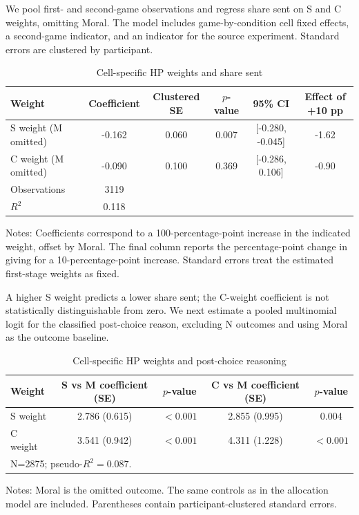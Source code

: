 \documentclass{article}
\begin{document}
We pool first- and second-game observations and regress share sent on S and C weights, omitting Moral. The model includes game-by-condition cell fixed effects, a second-game indicator, and an indicator for the source experiment. Standard errors are clustered by participant.

\begin{table}[H]
\centering
\caption{Cell-specific HP weights and share sent}
\label{tab:within_allocation_prediction}
\begin{tabular}{lccccc}
\toprule
Weight & Coefficient & Clustered SE & $p$-value & 95\% CI & Effect of +10 pp \\
\midrule
S weight (M omitted) & -0.162 & 0.060 & 0.007 & [-0.280, -0.045] & -1.62 \\
C weight (M omitted) & -0.090 & 0.100 & 0.369 & [-0.286, 0.106] & -0.90 \\
\midrule
Observations & 3119 & & & & \\ 
$R^2$ & 0.118 & & & & \\ 
\bottomrule
\end{tabular}
\begin{flushleft}
\footnotesize Notes: Coefficients correspond to a 100-percentage-point increase in the indicated weight, offset by Moral. The final column reports the percentage-point change in giving for a 10-percentage-point increase. Standard errors treat the estimated first-stage weights as fixed.
\end{flushleft}
\end{table}

A higher S weight predicts a lower share sent; the C-weight coefficient is not statistically distinguishable from zero. We next estimate a pooled multinomial logit for the classified post-choice reason, excluding N outcomes and using Moral as the outcome baseline.

\begin{table}[H]
\centering
\caption{Cell-specific HP weights and post-choice reasoning}
\label{tab:within_reasoning_prediction}
\begin{tabular}{lcccc}
\toprule
Weight & S vs M coefficient (SE) & $p$-value & C vs M coefficient (SE) & $p$-value \\
\midrule
S weight & 2.786 (0.615) & $<0.001$ & 2.855 (0.995) & 0.004 \\
C weight & 3.541 (0.942) & $<0.001$ & 4.311 (1.228) & $<0.001$ \\
\midrule
\multicolumn{5}{l}{N=2875; pseudo-$R^2=0.087$.} \\
\bottomrule
\end{tabular}
\begin{flushleft}
\footnotesize Notes: Moral is the omitted outcome. The same controls as in the allocation model are included. Parentheses contain participant-clustered standard errors.
\end{flushleft}
\end{table}
\end{document}
